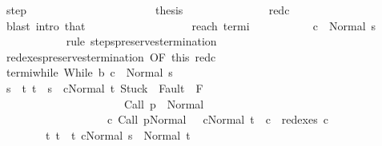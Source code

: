 \begin{isabellebody}
\ step\isanewline
\ \ \ \ \ \ \ \ \ \ \isamarkupfalse%
\isanewline
\ \ \ \ \ \ \ \ \ \ \isamarkupfalse%
\ {\isacharquery}thesis\ \isanewline
\ \ \ \ \ \ \ \ \ \ \ \ \isamarkupfalse%
\ red{\isacharunderscore}c{\isacharprime}{\isacharprime}\isanewline
\ \ \ \ \ \ \ \ \ \ \ \ \isamarkupfalse%
\ {\isacharparenleft}blast\ intro{\isacharcolon}\ that{\isacharparenright}\isanewline
\ \ \ \ \ \ \ \ \isamarkupfalse%
\isanewline
\ \ \ \ \ \ \ \ \isamarkupfalse%
\ reach\ termi\ \isanewline
\ \ \ \ \ \ \ \ \isamarkupfalse%
\ {\isachardoublequoteopen}{\isasymGamma}{\isasymturnstile}c{\isacharprime}\ {\isasymdown}\ Normal\ s{\isachardoublequoteclose}\isanewline
\ \ \ \ \ \ \ \ \ \ \isamarkupfalse%
\ {\isacharparenleft}rule\ steps{\isacharunderscore}preserves{\isacharunderscore}termination{\isacharprime}{\isacharparenright}\isanewline
\ \ \ \ \ \ \ \ \isamarkupfalse%
\ redexes{\isacharunderscore}preserves{\isacharunderscore}termination\ {\isacharbrackleft}OF\ this\ red{\isacharunderscore}c{\isacharprime}{\isacharbrackright}\isanewline
\ \ \ \ \ \ \ \ \isamarkupfalse%
\ termi{\isacharunderscore}while{\isacharcolon}\ {\isachardoublequoteopen}{\isasymGamma}{\isasymturnstile}While\ b\ c\ {\isasymdown}\ Normal\ s{\isachardoublequoteclose}\ \isacommand{{\isachardot}}\isamarkupfalse%
\isanewline
\ \ \ \ \ \ \ \ \isamarkupfalse%
\ {\isachardoublequoteopen}s\ {\isasymin}\ {\isacharbraceleft}t{\isachardot}\ t\ {\isacharequal}\ s\ {\isasymand}\ {\isasymGamma}{\isasymturnstile}{\isasymlangle}c{\isacharcomma}Normal\ t{\isasymrangle}\ {\isasymRightarrow}{\isasymnotin}{\isacharparenleft}{\isacharbraceleft}Stuck{\isacharbraceright}\ {\isasymunion}\ Fault\ {\isacharbackquote}\ {\isacharparenleft}{\isacharminus}F{\isacharparenright}{\isacharparenright}\ {\isasymand}\ \isanewline
\ \ \ \ \ \ \ \ \ \ \ \ \ \ \ \ \ \ \ \ \ \ {\isasymGamma}{\isasymturnstile}Call\ p\ {\isasymdown}\ Normal\ {\isasymsigma}\ {\isasymand}\isanewline
\ \ \ \ \ \ \ \ \ \ \ \ \ \ \ \ \ \ \ {\isacharparenleft}{\isasymexists}c{\isacharprime}{\isachardot}\ {\isasymGamma}{\isasymturnstile}{\isacharparenleft}Call\ p{\isacharcomma}Normal\ {\isasymsigma}{\isacharparenright}\ {\isasymrightarrow}\isactrlsup {\isacharplus}\ {\isacharparenleft}c{\isacharprime}{\isacharcomma}Normal\ t{\isacharparenright}\ {\isasymand}\ c\ {\isasymin}\ redexes\ c{\isacharprime}{\isacharparenright}{\isacharbraceright}\ {\isasymand}\isanewline
\ \ \ \ \ \ \ \ {\isacharparenleft}{\isasymforall}t{\isachardot}\ t\ {\isasymin}\ {\isacharbraceleft}t{\isachardot}\ {\isasymGamma}{\isasymturnstile}{\isasymlangle}c{\isacharcomma}Normal\ s{\isasymrangle}\ {\isasymRightarrow}\ Normal\ t{\isacharbraceright}\ {\isasymlongrightarrow}\isanewline

\end{isabellebody}
